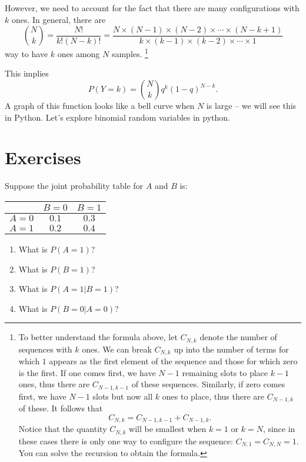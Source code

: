 \noindent
However, we need to account for the fact that there are many configurations with $k$ ones. In general, there are 
\begin{equation*}
{N \choose k} = \frac{N!}{k!(N-k)!} = \frac{N \times (N-1) \times (N-2) \times \cdots \times (N-k+1)}{k \times (k-1) \times (k-2) \times \cdots \times 1}
\end{equation*}
way to have $k$ ones among $N$ samples. 
\footnote{To better understand the formula above, let $C_{N,k}$ denote the number of sequences with $k$ ones. We can break $C_{N,k}$ up into the number of terms for which $1$ appears as the first element of the sequence and those for which zero is the first. If one comes first, we have $N-1$ remaining slots to place $k-1$ ones, thus there are $C_{N-1,k-1}$ of these sequences. Similarly, if zero comes first, we have $N-1$ slots but now all $k$ ones to place, thus there are $C_{N-1,k}$ of these. It follows that 
\begin{equation*}
C_{N,k} = C_{N-1,k-1} + C_{N-1,k}. 
\end{equation*}
Notice that the quantity $C_{N,k}$ will be smallest when $k=1$ or $k=N$, since in these cases there is only one way to configure the sequence: $C_{N,1} = C_{N,N} = 1$.  You can solve the recursion to obtain the formula. }
%

This implies 
\begin{equation*}
P(Y=k)=  {N \choose k}q^{k}(1-q)^{N-k}. 
\end{equation*}
A graph of this function looks like a bell curve when $N$ is large -- we will see this in Python. Let's explore binomial random variables in python.  


\newpage 

\section*{Exercises}
\begin{exercise}
Suppose the joint probability table for $A$ and $B$ is:
\begin{center}
\begin{tabular}{c|cc}
 & $B=0$ & $B=1$ \\
\hline
$A=0$ & $0.1$ & $0.3$ \\
$A=1$ & $0.2$ & $0.4$ \\
\end{tabular}
\end{center}
\begin{enumerate}[label=(\alph*)]
\item What is $P(A=1)$?
\item What is $P(B=1)$?
\item What is $P(A=1|B=1)$?
\item What is $P(B=0|A=0)$?
\end{enumerate}
\end{exercise}


